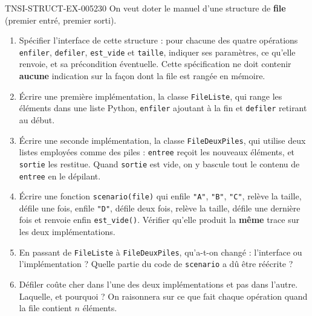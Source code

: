 \begin{exercice}{TNSI-STRUCT-EX-005}{2}{30}
On veut doter le manuel d'une structure de \textbf{file} (premier entré, premier
sorti).
\begin{enumerate}
  \item Spécifier l'interface de cette structure : pour chacune des quatre
    opérations \lstinline{enfiler}, \lstinline{defiler}, \lstinline{est_vide} et
    \lstinline{taille}, indiquer ses paramètres, ce qu'elle renvoie, et sa
    précondition éventuelle. Cette spécification ne doit contenir \textbf{aucune}
    indication sur la façon dont la file est rangée en mémoire.
  \item Écrire une première implémentation, la classe \lstinline{FileListe}, qui
    range les éléments dans une liste Python, \lstinline{enfiler} ajoutant à la
    fin et \lstinline{defiler} retirant au début.
  \item Écrire une seconde implémentation, la classe \lstinline{FileDeuxPiles},
    qui utilise deux listes employées comme des piles : \lstinline{entree} reçoit
    les nouveaux éléments, et \lstinline{sortie} les restitue. Quand
    \lstinline{sortie} est vide, on y bascule tout le contenu de
    \lstinline{entree} en le dépilant.
  \item Écrire une fonction \lstinline{scenario(file)} qui enfile \lstinline{"A"},
    \lstinline{"B"}, \lstinline{"C"}, relève la taille, défile une fois, enfile
    \lstinline{"D"}, défile deux fois, relève la taille, défile une dernière fois
    et renvoie enfin \lstinline{est_vide()}. Vérifier qu'elle produit la
    \textbf{même} trace sur les deux implémentations.
  \item En passant de \lstinline{FileListe} à \lstinline{FileDeuxPiles}, qu'a-t-on
    changé : l'interface ou l'implémentation ? Quelle partie du code de
    \lstinline{scenario} a dû être réécrite ?
  \item Défiler coûte cher dans l'une des deux implémentations et pas dans
    l'autre. Laquelle, et pourquoi ? On raisonnera sur ce que fait chaque
    opération quand la file contient $n$ éléments.
\end{enumerate}
\end{exercice}
